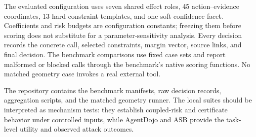 \documentclass[11pt]{article}
\begin{document}
The evaluated configuration uses seven shared effect roles, 45 action--evidence coordinates, 13 hard constraint templates, and one soft confidence facet. Coefficients and risk budgets are configuration constants; freezing them before scoring does not substitute for a parameter-sensitivity analysis. Every decision records the concrete call, selected constraints, margin vector, source links, and final decision. The benchmark comparisons use fixed case sets and report malformed or blocked calls through the benchmark's native scoring functions. No matched geometry case invokes a real external tool.

The repository contains the benchmark manifests, raw decision records, aggregation scripts, and the matched geometry runner. The local suites should be interpreted as mechanism tests: they establish coupled-risk and certificate behavior under controlled inputs, while AgentDojo and ASB provide the task-level utility and observed attack outcomes.
\end{document}
